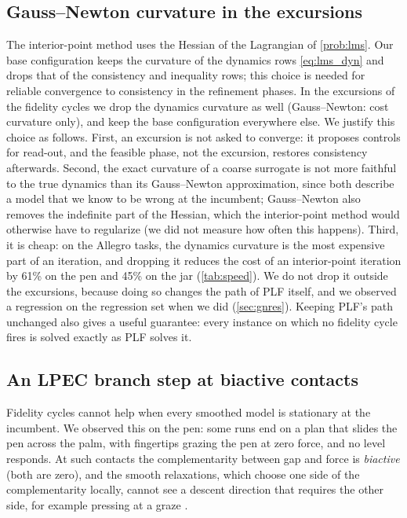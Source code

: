 \documentclass[11pt]{article}
\theoremstyle{remark}
\begin{document}
\subsection{Gauss--Newton curvature in the excursions}
\label{sec:gn}

The interior-point method uses the Hessian of the Lagrangian of \cref{prob:lms}. Our base configuration keeps the curvature of the dynamics rows \cref{eq:lms_dyn} and drops that of the consistency and inequality rows; this choice is needed for reliable convergence to consistency in the refinement phases. In the excursions of the fidelity cycles we drop the dynamics curvature as well (Gauss--Newton: cost curvature only), and keep the base configuration everywhere else. We justify this choice as follows. First, an excursion is not asked to converge: it proposes controls for read-out, and the feasible phase, not the excursion, restores consistency afterwards. Second, the exact curvature of a coarse surrogate is not more faithful to the true dynamics than its Gauss--Newton approximation, since both describe a model that we know to be wrong at the incumbent; Gauss--Newton also removes the indefinite part of the Hessian, which the interior-point method would otherwise have to regularize (we did not measure how often this happens). Third, it is cheap: on the Allegro tasks, the dynamics curvature is the most expensive part of an iteration, and dropping it reduces the cost of an interior-point iteration by 61\% on the pen and 45\% on the jar (\cref{tab:speed}). We do not drop it outside the excursions, because doing so changes the path of PLF itself, and we observed a regression on the regression set when we did (\cref{sec:gnres}). Keeping PLF's path unchanged also gives a useful guarantee: every instance on which no fidelity cycle fires is solved exactly as PLF solves it.

\subsection{An LPEC branch step at biactive contacts}
\label{sec:lpec}

Fidelity cycles cannot help when every smoothed model is stationary at the incumbent. We observed this on the pen: some runs end on a plan that slides the pen across the palm, with fingertips grazing the pen at zero force, and no level responds. At such contacts the complementarity between gap and force is \emph{biactive} (both are zero), and the smooth relaxations, which choose one side of the complementarity locally, cannot see a descent direction that requires the other side, for example pressing at a graze \cite{scheel2000mathematical}.
\end{document}
